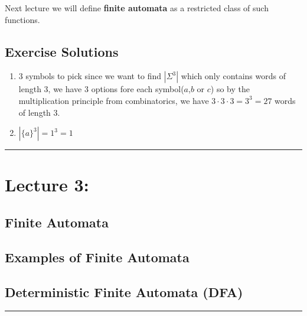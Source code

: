 \documentclass{article}
\begin{document}
Next lecture we will define \textbf{finite automata} as a restricted class of such functions.

\subsection*{Exercise Solutions}
\begin{enumerate}
    \item 3 symbols to pick since we want to find $|\Sigma^3|$ which only contains words of length 3, we have 3 options fore each symbol($a$,$b$ or $c$) so by the multiplication principle from combinatorics, we have $3\cdot3\cdot3=3^3=27$ words of length 3.
    \item $|\{a\}^3|=1^3=1$
\end{enumerate}

\begin{center}
	\rule{450pt}{1pt} 
\end{center}
\newpage

\section*{Lecture 3:}

\subsection*{Finite Automata}

\subsection*{Examples of Finite Automata}

\subsection*{Deterministic Finite Automata (DFA)}













\begin{center}
	\rule{450pt}{1pt} 
\end{center}
\newpage
\end{document}
